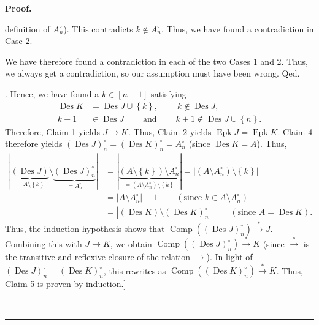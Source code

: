 \documentclass[numbers=enddot,12pt,final,onecolumn,notitlepage]{scrartcl}%
\theoremstyle{definition}
\newenvironment{proof}[1][Proof]{\noindent\textbf{#1.} }{\ \rule{0.5em}{0.5em}}
\begin{document}
\begin{proof}
{definition of $A_{n}^{\circ}$). This contradicts $k\notin A_{n}^{\circ}$.
Thus, we have found a contradiction in Case 2.
\par
We have therefore found a contradiction in each of the two Cases 1 and 2.
Thus, we always get a contradiction, so our assumption must have been wrong.
Qed.}. Hence, we have found a $k\in\left[  n-1\right]  $ satisfying%
\begin{align*}
\operatorname*{Des}K  &  =\operatorname*{Des}J\cup\left\{  k\right\}
,\ \ \ \ \ \ \ \ \ \ k\notin\operatorname*{Des}J,\\
k-1  &  \in\operatorname*{Des}J\ \ \ \ \ \ \ \ \ \ \text{and}%
\ \ \ \ \ \ \ \ \ \ k+1\notin\operatorname*{Des}J\cup\left\{  n\right\}  .
\end{align*}
Therefore, Claim 1 yields $J\rightarrow K$. Thus, Claim 2 yields
$\operatorname*{Epk}J=\operatorname*{Epk}K$. Claim 4 therefore yields $\left(
\operatorname*{Des}J\right)  _{n}^{\circ}=\left(  \operatorname*{Des}K\right)
_{n}^{\circ}=A_{n}^{\circ}$ (since $\operatorname*{Des}K=A$). Thus,%
\begin{align*}
\left\vert \underbrace{\left(  \operatorname*{Des}J\right)  }_{=A\setminus
\left\{  k\right\}  }\setminus\underbrace{\left(  \operatorname*{Des}J\right)
_{n}^{\circ}}_{=A_{n}^{\circ}}\right\vert  &  =\left\vert \underbrace{\left(
A\setminus\left\{  k\right\}  \right)  \setminus A_{n}^{\circ}}_{=\left(
A\setminus A_{n}^{\circ}\right)  \setminus\left\{  k\right\}  }\right\vert
=\left\vert \left(  A\setminus A_{n}^{\circ}\right)  \setminus\left\{
k\right\}  \right\vert \\
&  =\left\vert A\setminus A_{n}^{\circ}\right\vert
-1\ \ \ \ \ \ \ \ \ \ \left(  \text{since }k\in A\setminus A_{n}^{\circ
}\right) \\
&  =\left\vert \left(  \operatorname*{Des}K\right)  \setminus\left(
\operatorname*{Des}K\right)  _{n}^{\circ}\right\vert
\ \ \ \ \ \ \ \ \ \ \left(  \text{since }A=\operatorname*{Des}K\right)  .
\end{align*}
Thus, the induction hypothesis shows that $\operatorname*{Comp}\left(  \left(
\operatorname*{Des}J\right)  _{n}^{\circ}\right)  \overset{\ast}{\rightarrow
}J$. Combining this with $J\rightarrow K$, we obtain $\operatorname*{Comp}%
\left(  \left(  \operatorname*{Des}J\right)  _{n}^{\circ}\right)
\overset{\ast}{\rightarrow}K$ (since $\overset{\ast}{\rightarrow}$ is the
transitive-and-reflexive closure of the relation $\rightarrow$). In light of
$\left(  \operatorname*{Des}J\right)  _{n}^{\circ}=\left(  \operatorname*{Des}%
K\right)  _{n}^{\circ}$, this rewrites as $\operatorname*{Comp}\left(  \left(
\operatorname*{Des}K\right)  _{n}^{\circ}\right)  \overset{\ast}{\rightarrow
}K$. Thus, Claim 5 is proven by induction.]


\end{proof}
\end{document}
